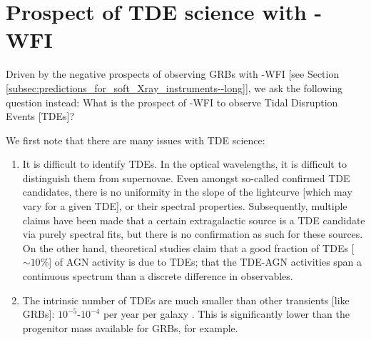 \section{Prospect of TDE science with \A-WFI}
\label{sec:prospects}
Driven by the negative prospects of observing GRBs with \A -WFI [see Section \ref{subsec:predictions_for_soft_Xray_instruments--long}], we ask the following question instead: What is the prospect of \A -WFI to observe Tidal Disruption Events [TDEs]?

We first note that there are many issues with TDE science:
\begin{enumerate}
\item It is difficult to identify TDEs. In the optical wavelengths, it is difficult to distinguish them from supernovae. Even amongst so-called confirmed TDE candidates, there is no uniformity in the slope of the lightcurve [which may vary for a given TDE], or their spectral properties. Subsequently, multiple claims have been made that a certain extragalactic source is a TDE candidate via purely spectral fits, but there is no confirmation as such for these sources. On the other hand, theoretical studies claim that a good fraction of TDEs [$\sim 10 \%$] of AGN activity is due to TDEs; that the TDE-AGN activities span a continuous spectrum than a discrete difference in observables.

\item The intrinsic number of TDEs are much smaller than other transients [like GRBs]: $10^{-5}$-$10^{-4}$ per year per galaxy \citep{Auchettl_et_al.-2018-ApJ}. This is significantly lower than the progenitor mass available for GRBs, for example.
\end{enumerate}

